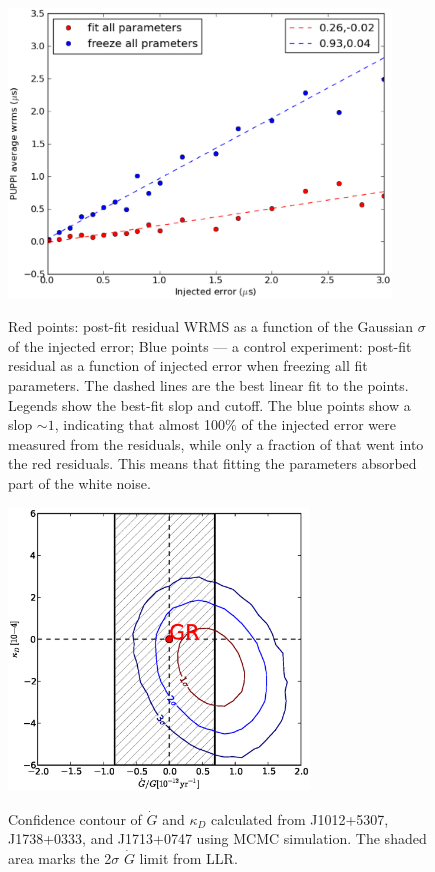 \documentclass[12pt,preprint]{aastex}
\begin{document}
\begin{figure}
\includegraphics[width=4in]{overfit.eps} \\ 
\caption {\label{fig:overfit} Red points: post-fit residual WRMS as a function of the Gaussian
$\sigma$ of the  injected error; Blue points --- a control experiment:
post-fit residual as a function of injected error when freezing all fit
parameters. The dashed lines are the best linear fit to the points. Legends
show the best-fit slop and cutoff. 
The blue points show a slop $\sim 1$,
indicating that almost 100\% of the injected error were measured from the
residuals, while only a fraction of that went into the red residuals. 
This means that fitting the parameters absorbed part of the white noise.
} 
\end{figure} 

\begin{figure}
\includegraphics[width=8cm]{GdotContour.ps} \\ 
\caption {\label{fig:Gdot} Confidence contour of $\dot{G}$ and $\kappa_D$
calculated from J1012+5307, J1738+0333, and J1713+0747 using MCMC simulation.
The shaded area marks the 2$\sigma$ $\dot{G}$ limit from LLR. 
} 
\end{figure} 







\end{document}
